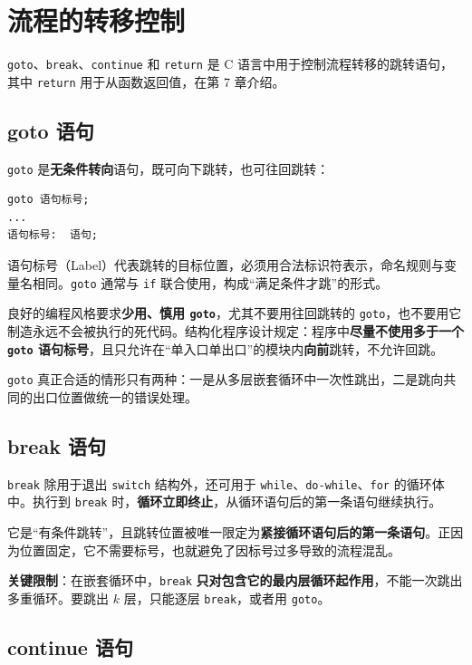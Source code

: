 \section{流程的转移控制}

\texttt{goto}、\texttt{break}、\texttt{continue} 和 \texttt{return} 是 C 语言中用于控制流程转移的跳转语句，其中 \texttt{return} 用于从函数返回值，在第 7 章介绍。

\subsection{goto 语句}

\texttt{goto} 是\textbf{无条件转向}语句，既可向下跳转，也可往回跳转：

\begin{lstlisting}
goto 语句标号;
...
语句标号:  语句;
\end{lstlisting}

语句标号（Label）代表跳转的目标位置，必须用合法标识符表示，命名规则与变量名相同。\texttt{goto} 通常与 \texttt{if} 联合使用，构成“满足条件才跳”的形式。

良好的编程风格要求\textbf{少用、慎用 \texttt{goto}}，尤其不要用往回跳转的 \texttt{goto}，也不要用它制造永远不会被执行的死代码。结构化程序设计规定：程序中\textbf{尽量不使用多于一个 \texttt{goto} 语句标号}，且只允许在“单入口单出口”的模块内\textbf{向前}跳转，不允许回跳。

\texttt{goto} 真正合适的情形只有两种：一是从多层嵌套循环中一次性跳出，二是跳向共同的出口位置做统一的错误处理。

\subsection{break 语句}

\texttt{break} 除用于退出 \texttt{switch} 结构外，还可用于 \texttt{while}、\texttt{do-while}、\texttt{for} 的循环体中。执行到 \texttt{break} 时，\textbf{循环立即终止}，从循环语句后的第一条语句继续执行。

它是“有条件跳转”，且跳转位置被唯一限定为\textbf{紧接循环语句后的第一条语句}。正因为位置固定，它不需要标号，也就避免了因标号过多导致的流程混乱。

\textbf{关键限制}：在嵌套循环中，\texttt{break} \textbf{只对包含它的最内层循环起作用}，不能一次跳出多重循环。要跳出 $k$ 层，只能逐层 \texttt{break}，或者用 \texttt{goto}。

\subsection{continue 语句}

